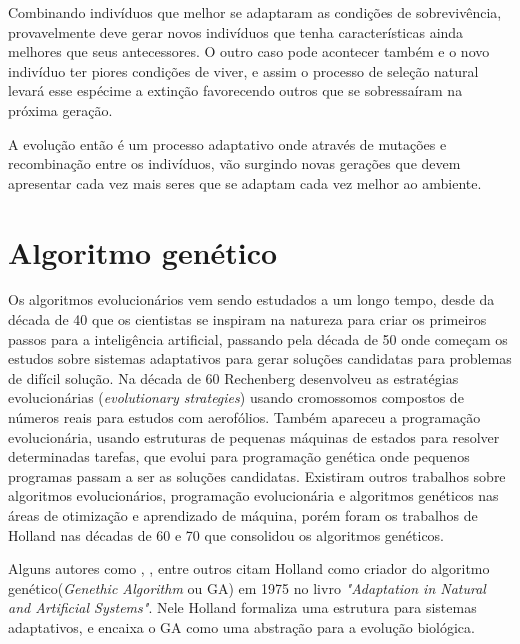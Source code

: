 Combinando indivíduos que melhor se adaptaram as condições de sobrevivência, provavelmente deve gerar novos indivíduos que tenha características ainda melhores que seus antecessores. O outro caso pode acontecer também e o novo indivíduo ter piores condições de viver, e assim o processo de seleção natural levará esse espécime a extinção favorecendo outros que se sobressaíram na próxima geração.

A evolução então é um processo adaptativo onde através de mutações e recombinação entre os indivíduos, vão surgindo novas gerações que devem apresentar cada vez mais seres que se adaptam cada vez melhor ao ambiente.

\section{Algoritmo genético}

Os algoritmos evolucionários vem sendo estudados a um longo tempo, desde da década de 40 que os cientistas se inspiram na natureza para criar os primeiros passos para a inteligência artificial, passando pela década de 50 onde começam os estudos sobre sistemas adaptativos para gerar soluções candidatas para problemas de difícil solução. Na década de 60 Rechenberg desenvolveu as estratégias evolucionárias (\textit{evolutionary strategies}) usando cromossomos compostos de números reais para estudos com aerofólios. Também apareceu a programação evolucionária, usando estruturas de pequenas máquinas de estados para resolver determinadas tarefas, que evolui para programação genética onde pequenos programas passam a ser as soluções candidatas. Existiram outros trabalhos sobre algoritmos evolucionários, programação evolucionária e algoritmos genéticos nas áreas de otimização e aprendizado de máquina, porém foram os trabalhos de Holland nas décadas de 60 e 70 que consolidou os algoritmos genéticos. \cite{Mitchell1996, Linden2008}

Alguns autores como \citeauthor{Mitchell1996}, \citeauthor{LeeJacobson2015}, \citeauthor{Kwong2001} entre outros citam Holland como criador do algoritmo genético(\textit{Genethic Algorithm} ou GA) em 1975 no livro \textit{"Adaptation in Natural and Artificial Systems"}. Nele Holland formaliza uma estrutura para sistemas adaptativos, e encaixa o GA como uma abstração para a evolução biológica.

